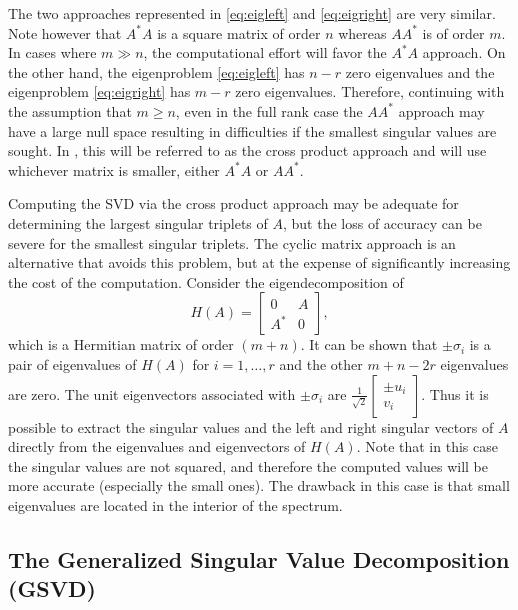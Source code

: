 The two approaches represented in \eqref{eq:eigleft} and \eqref{eq:eigright} are very similar. Note however that $A^*A$ is a square matrix of order $n$ whereas $AA^*$ is of order $m$. In cases where $m\gg n$, the computational effort will favor the $A^*A$ approach. On the other hand, the eigenproblem \eqref{eq:eigleft} has $n-r$ zero eigenvalues and the eigenproblem \eqref{eq:eigright} has $m-r$ zero eigenvalues. Therefore, continuing with the assumption that $m\geq n$, even in the full rank case the $AA^*$ approach may have a large null space resulting in difficulties if the smallest singular values are sought. In \slepc, this will be referred to as the cross product approach and will use whichever matrix is smaller, either $A^*A$ or $AA^*$.

Computing the SVD via the cross product approach may be adequate for determining the largest singular triplets of $A$, but the loss of accuracy can be severe for the smallest singular triplets. The cyclic matrix approach is an alternative that avoids this problem, but at the expense of significantly increasing the cost of the computation. Consider the eigendecomposition of
\begin{equation}
\label{eq:cyclic}
H(A)=\begin{bmatrix}0&A\\A^*&0\end{bmatrix},
\end{equation}
which is a Hermitian matrix of order $(m+n)$. It can be shown that $\pm\sigma_i$ is a pair of eigenvalues of $H(A)$ for $i=1,\ldots,r$ and the other $m+n-2r$ eigenvalues are zero. The unit eigenvectors associated with $\pm\sigma_i$ are $\frac{1}{\sqrt{2}}\left[\begin{smallmatrix}\pm u_i\\v_i\end{smallmatrix}\right]$. Thus it is possible to extract the singular values and the left and right singular vectors of $A$ directly from the eigenvalues and eigenvectors of $H(A)$. Note that in this case the singular values are not squared, and therefore the computed values will be more accurate (especially the small ones). The drawback in this case is that small eigenvalues are located in the interior of the spectrum.

\subsection{\label{sec:gsvd}The Generalized Singular Value Decomposition (GSVD)}

